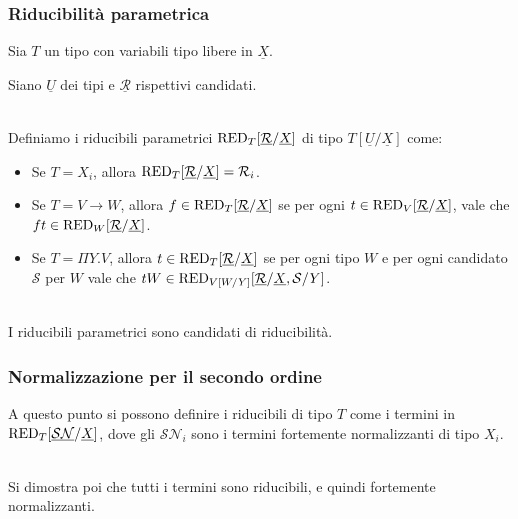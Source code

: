 \documentclass{beamer}
\newcommand{\ar}{\rightarrow}
\newcommand{\can}{\mathcal}
\begin{document}
\begin{frame}
    \frametitle{Riducibilit\`a parametrica}
    Sia $T$ un tipo con variabili tipo libere in $\underline{X}$.

    Siano $\underline{U}$ dei tipi e $\underline{\can{R}}$ rispettivi candidati.
    \\~\

    Definiamo i riducibili parametrici $\red_T\ronx$ di tipo $T[\underline{U}/
    \underline{X}]$ come:
    \begin{itemize}
        \item Se $T=X_i$, allora $\red_T\ronx = \can{R}_i$.
        \item Se $T=V\ar W$, allora $f\in\red_T\ronx$ se per ogni
            $t\in\red_V\ronx$, vale che $ft\in\red_W\ronx$.
        \item Se $T=\Pi Y.V$, allora $t\in\red_T\ronx$ se per ogni tipo $W$ e
            per ogni candidato $\can{S}$ per $W$ vale che $tW\in\red_{V[W/Y]}
            [\underline{\can{R}}/\underline{X}, \can{S}/Y]$.
    \\~\
    \end{itemize}
    
    I riducibili parametrici sono candidati di riducibilit\`a.
\end{frame}

\begin{frame}
    \frametitle{Normalizzazione per il secondo ordine}
    A questo punto si possono definire i riducibili di tipo $T$ come i termini
    in $\red_T[\underline{\can{SN}}/\underline{X}]$, dove gli $\can{SN}_i$ sono
    i termini fortemente normalizzanti di tipo $X_i$.
    \\~\

    Si dimostra poi che tutti i termini sono riducibili, e quindi fortemente
    normalizzanti.
\end{frame}
\end{document}
